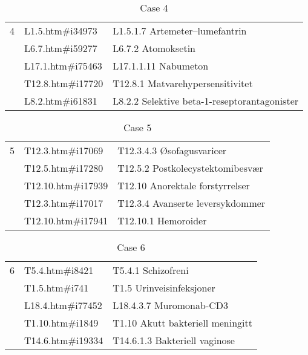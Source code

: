 \begin{table}[htbp]\centering\footnotesize
\caption{Case 4}
\begin{tabular}{cll}
\toprule
4 & L1.5.htm\#i34973   & L1.5.1.7 Artemeter–lumefantrin \\
  & L6.7.htm\#i59277   & L6.7.2 Atomoksetin \\
  & L17.1.htm\#i75463  & L17.1.1.11 Nabumeton \\
  & T12.8.htm\#i17720  & T12.8.1 Matvarehypersensitivitet \\
  & L8.2.htm\#i61831   & L8.2.2  Selektive beta-1-reseptorantagonister \\
\bottomrule
\end{tabular}
\end{table}
\begin{table}[htbp]\centering\footnotesize
\caption{Case 5}
\begin{tabular}{cll}
\toprule
5 & T12.3.htm\#i17069  & T12.3.4.3 Øsofagusvaricer \\
  & T12.5.htm\#i17280  & T12.5.2 Postkolecystektomibesvær \\
  & T12.10.htm\#i17939 & T12.10 Anorektale forstyrrelser \\
  & T12.3.htm\#i17017  & T12.3.4 Avanserte leversykdommer \\
  & T12.10.htm\#i17941 & T12.10.1 Hemoroider \\
\bottomrule
\end{tabular}
\end{table}
\begin{table}[htbp]\centering\footnotesize
\caption{Case 6}
\begin{tabular}{cll}
\toprule
6 & T5.4.htm\#i8421    & T5.4.1 Schizofreni \\
  & T1.5.htm\#i741     & T1.5 Urinveisinfeksjoner \\
  & L18.4.htm\#i77452  & L18.4.3.7 Muromonab-CD3 \\
  & T1.10.htm\#i1849   & T1.10 Akutt bakteriell meningitt \\
  & T14.6.htm\#i19334  & T14.6.1.3 Bakteriell vaginose \\
\bottomrule
\end{tabular}
\end{table}
